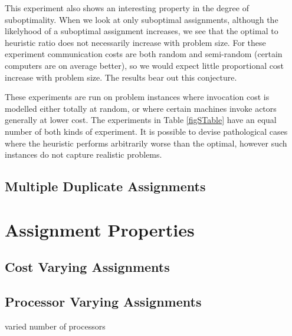 This experiment also shows an interesting property in the degree of suboptimality.
When we look at only suboptimal assignments, although the likelyhood of a suboptimal assignment increases, we see that the optimal to heuristic ratio does not necessarily increase with problem size.
For these experiment communication costs are both random and semi-random (certain computers are on average better), so we would expect little proportional cost increase with problem size.
The results bear out this conjecture.

These experiments are run on problem instances where invocation cost is modelled either totally at random, or where certain machines invoke actors generally at lower cost.
The experiments in Table \ref{figSTable} have an equal number of both kinds of experiment.
It is possible to devise pathological cases where the heuristic performs arbitrarily worse than the optimal, however such instances do not capture realistic problems.

\subsection{Multiple Duplicate Assignments}

\section{Assignment Properties}

\subsection{Cost Varying Assignments}

\subsection{Processor Varying Assignments}

varied number of processors
